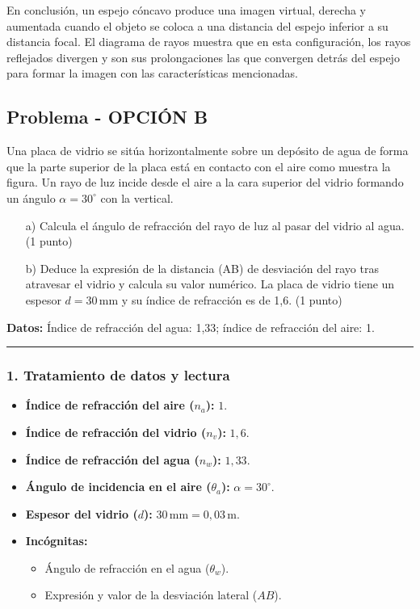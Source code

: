\begin{cajaconclusion}
En conclusión, un espejo cóncavo produce una imagen virtual, derecha y aumentada cuando el objeto se coloca a una distancia del espejo inferior a su distancia focal. El diagrama de rayos muestra que en esta configuración, los rayos reflejados divergen y son sus prolongaciones las que convergen detrás del espejo para formar la imagen con las características mencionadas.
\end{cajaconclusion}

\newpage
\subsection{Problema - OPCIÓN B}
\label{subsec:IIIB_2012_sep}

\begin{cajaenunciado}
Una placa de vidrio se sitúa horizontalmente sobre un depósito de agua de forma que la parte superior de la placa está en contacto con el aire como muestra la figura. Un rayo de luz incide desde el aire a la cara superior del vidrio formando un ángulo $\alpha=30^\circ$ con la vertical.
\begin{enumerate}
    \item[a)] Calcula el ángulo de refracción del rayo de luz al pasar del vidrio al agua. (1 punto)
    \item[b)] Deduce la expresión de la distancia (AB) de desviación del rayo tras atravesar el vidrio y calcula su valor numérico. La placa de vidrio tiene un espesor $d=30\,\text{mm}$ y su índice de refracción es de 1,6. (1 punto)
\end{enumerate}
\textbf{Datos:} Índice de refracción del agua: 1,33; índice de refracción del aire: 1.
\end{cajaenunciado}
\hrule

\subsubsection*{1. Tratamiento de datos y lectura}
\begin{itemize}
    \item \textbf{Índice de refracción del aire ($n_a$):} $1$.
    \item \textbf{Índice de refracción del vidrio ($n_v$):} $1,6$.
    \item \textbf{Índice de refracción del agua ($n_w$):} $1,33$.
    \item \textbf{Ángulo de incidencia en el aire ($\theta_a$):} $\alpha = 30^\circ$.
    \item \textbf{Espesor del vidrio ($d$):} $30\,\text{mm} = 0,03\,\text{m}$.
    \item \textbf{Incógnitas:}
        \begin{itemize}
            \item Ángulo de refracción en el agua ($\theta_w$).
            \item Expresión y valor de la desviación lateral ($AB$).
        \end{itemize}
\end{itemize}

